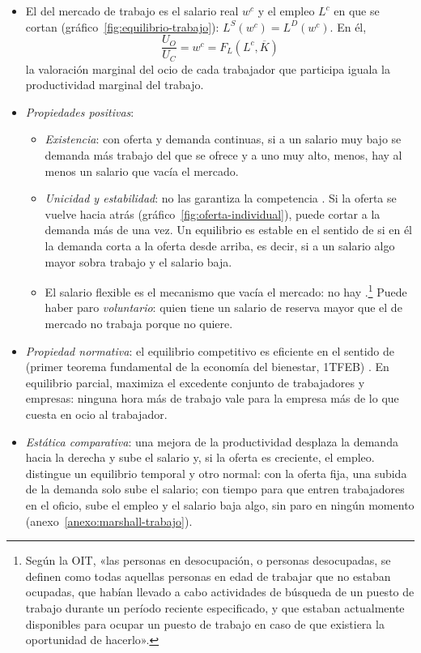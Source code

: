 \documentclass[11pt]{article}
\begin{document}
\begin{itemize}
\item El  del mercado de trabajo es el salario real $w^c$ y el empleo $L^c$ en que se cortan (gráfico~\ref{fig:equilibrio-trabajo}): $L^S(w^c)=L^D(w^c)$. En él,
  \[
  \frac{U_O}{U_C}=w^c=F_L(L^c,\overline{K})
  \]
  la valoración marginal del ocio de cada trabajador que participa iguala la productividad marginal del trabajo.
\item \emph{Propiedades positivas}:
  \begin{itemize}
  \item \emph{Existencia}: con oferta y demanda continuas, si a un salario muy bajo se demanda más trabajo del que se ofrece y a uno muy alto, menos, hay al menos un salario que vacía el mercado.
  \item \emph{Unicidad y estabilidad}: no las garantiza la competencia . Si la oferta se vuelve hacia atrás (gráfico~\ref{fig:oferta-individual}), puede cortar a la demanda más de una vez. Un equilibrio es estable en el sentido de  si en él la demanda corta a la oferta desde arriba, es decir, si a un salario algo mayor sobra trabajo y el salario baja.
  \item El salario flexible es el mecanismo que vacía el mercado: no hay .\footnote{Según la OIT, «las personas en desocupación, o personas desocupadas, se definen como todas aquellas personas en edad de trabajar que no estaban ocupadas, que habían llevado a cabo actividades de búsqueda de un puesto de trabajo durante un período reciente especificado, y que estaban actualmente disponibles para ocupar un puesto de trabajo en caso de que existiera la oportunidad de hacerlo»\nocite{OIT2013Resolucion}.} Puede haber paro \emph{voluntario}: quien tiene un salario de reserva mayor que el de mercado no trabaja porque no quiere.
  \end{itemize}
\item \emph{Propiedad normativa}: el equilibrio competitivo es eficiente en el sentido de  (primer teorema fundamental de la economía del bienestar, 1TFEB) . En equilibrio parcial, maximiza el excedente conjunto de trabajadores y empresas: ninguna hora más de trabajo vale para la empresa más de lo que cuesta en ocio al trabajador.
\item \emph{Estática comparativa}: una mejora de la productividad desplaza la demanda hacia la derecha y sube el salario y, si la oferta es creciente, el empleo.  distingue un equilibrio temporal y otro normal: con la oferta fija, una subida de la demanda solo sube el salario; con tiempo para que entren trabajadores en el oficio, sube el empleo y el salario baja algo, sin paro en ningún momento (anexo~\ref{anexo:marshall-trabajo}).

\end{itemize}
\end{document}
